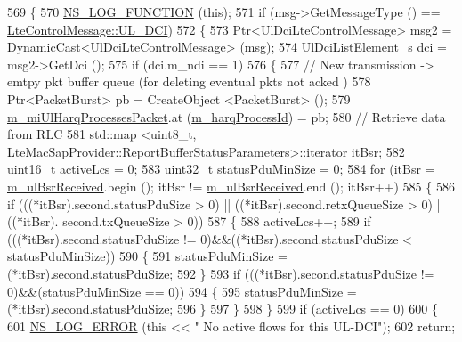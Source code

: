 \begin{DoxyCode}
569 \{
570   \hyperlink{log-macros-disabled_8h_a90b90d5bad1f39cb1b64923ea94c0761}{NS\_LOG\_FUNCTION} (\textcolor{keyword}{this});
571   \textcolor{keywordflow}{if} (msg->GetMessageType () == \hyperlink{classns3_1_1LteControlMessage_a9f9798d5aa8ad40f6432285b4b06135bab9cab20479fe8288477132799afcab91}{LteControlMessage::UL\_DCI})
572     \{
573       Ptr<UlDciLteControlMessage> msg2 = DynamicCast<UlDciLteControlMessage> (msg);
574       UlDciListElement\_s dci = msg2->GetDci ();
575       \textcolor{keywordflow}{if} (dci.m\_ndi == 1)
576         \{
577           \textcolor{comment}{// New transmission -> emtpy pkt buffer queue (for deleting eventual pkts not acked )}
578           Ptr<PacketBurst> pb = CreateObject <PacketBurst> ();
579           \hyperlink{classns3_1_1LteUeMac_af895ce47f438d39c2753740352120c45}{m\_miUlHarqProcessesPacket}.at (\hyperlink{classns3_1_1LteUeMac_ad7b724012bfa1d25bd750f40a66a1aaf}{m\_harqProcessId}) = pb;
580           \textcolor{comment}{// Retrieve data from RLC}
581           std::map <uint8\_t, LteMacSapProvider::ReportBufferStatusParameters>::iterator itBsr;
582           uint16\_t activeLcs = 0;
583           uint32\_t statusPduMinSize = 0;
584           \textcolor{keywordflow}{for} (itBsr = \hyperlink{classns3_1_1LteUeMac_ab1de37ecba7b76c9de1dd81bf49ac66d}{m\_ulBsrReceived}.begin (); itBsr != 
      \hyperlink{classns3_1_1LteUeMac_ab1de37ecba7b76c9de1dd81bf49ac66d}{m\_ulBsrReceived}.end (); itBsr++)
585             \{
586               \textcolor{keywordflow}{if} (((*itBsr).second.statusPduSize > 0) || ((*itBsr).second.retxQueueSize > 0) || ((*itBsr).
      second.txQueueSize > 0))
587                 \{
588                   activeLcs++;
589                   \textcolor{keywordflow}{if} (((*itBsr).second.statusPduSize != 0)&&((*itBsr).second.statusPduSize < 
      statusPduMinSize))
590                     \{
591                       statusPduMinSize = (*itBsr).second.statusPduSize;
592                     \}
593                   \textcolor{keywordflow}{if} (((*itBsr).second.statusPduSize != 0)&&(statusPduMinSize == 0))
594                     \{
595                       statusPduMinSize = (*itBsr).second.statusPduSize;
596                     \}
597                 \}
598             \}
599           \textcolor{keywordflow}{if} (activeLcs == 0)
600             \{
601               \hyperlink{group__logging_ga0261a8db1d4ac5f79417d117634fd455}{NS\_LOG\_ERROR} (\textcolor{keyword}{this} << \textcolor{stringliteral}{" No active flows for this UL-DCI"});
602               \textcolor{keywordflow}{return};

\end{DoxyCode}

